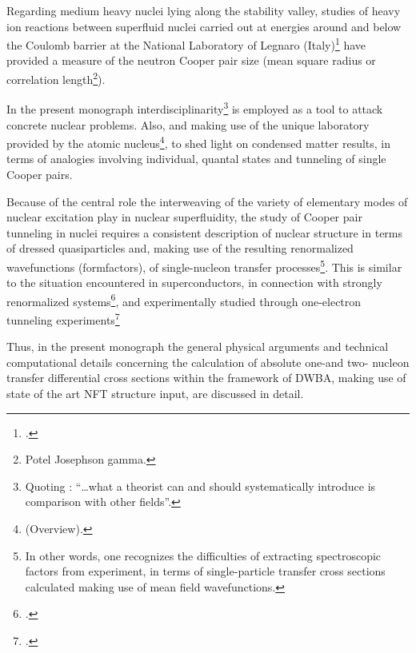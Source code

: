  

Regarding medium heavy nuclei lying along the stability valley,  studies of heavy ion reactions between superfluid nuclei carried out at energies around and  below the Coulomb barrier at the National Laboratory of Legnaro (Italy)\footnote{\cite{Montanari:14}.} have provided a measure of the neutron Cooper pair size (mean square radius or correlation length\footnote{\cite{Potel20b,t} Potel Josephson gamma.}). 


In the present monograph interdisciplinarity\footnote{Quoting \cite{deGennes:74}: ``\dots what a theorist can and should systematically introduce is comparison with other fields''. } is employed as a tool to attack concrete nuclear problems. Also, and  making use of the unique laboratory provided by  the atomic nucleus\footnote{\cite{Bohr:19} (Overview).}, to shed light on condensed matter results, in terms of analogies involving individual, quantal  states and tunneling of single Cooper pairs.


Because of the central role the interweaving of the variety of elementary modes of nuclear excitation play in nuclear superfluidity, the study of Cooper pair tunneling in nuclei requires  a consistent description of nuclear structure in terms of dressed quasiparticles and, making use of the resulting renormalized wavefunctions (formfactors),  of single-nucleon transfer processes\footnote{In other words, one recognizes the difficulties of extracting spectroscopic factors from experiment, in terms of single-particle transfer cross sections calculated making use of mean field wavefunctions.}. This is similar to the situation encountered in superconductors, in connection with strongly renormalized systems\footnote{\cite{Eliashberg:60}.}, and experimentally studied through one-electron tunneling experiments\footnote{\cite{Giaver:73}.} 

Thus, in the present monograph the general physical arguments and technical computational details concerning the calculation of  absolute one-and two- nucleon  transfer differential cross sections within the framework of DWBA, making use of state of the art NFT structure input, are discussed in detail. 


